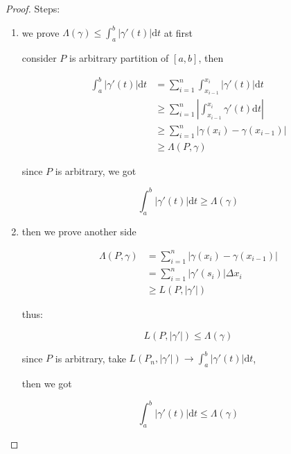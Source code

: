 \begin{proof}
    Steps:


    \begin{enumerate}
        \item we prove $\Lambda(\gamma) \le \int_a^b \left| \gamma'(t) \right| \mathrm{d} t$ at first

        consider $P$ is arbitrary partition of $[a,b]$, then

        \begin{align*}
            \int_a^b \left| \gamma'(t) \right| \mathrm{d}t  &= \sum_{i=1}^{n}\int_{x_{i-1}}^{x_i} \left| \gamma'(t) \right| \mathrm{d}t \\
            & \ge \sum_{i=1}^{n} \left| \int_{x_{i-1}}^{x_i}  \gamma'(t) \mathrm{d}t  \right| \\
            & \ge\sum_{i=1}^{n} \left| \gamma(x_i) - \gamma(x_{i-1})  \right| \\
            & \ge \Lambda(P, \gamma)
        \end{align*}

        since $P$ is arbitrary, we got

        \[
            \int_a^b \left| \gamma'(t) \right| \mathrm{d}t \ge \Lambda(\gamma)
        \]

        \item then we prove another side
        
        \begin{align*}
            \Lambda(P, \gamma) &= \sum_{i=1}^{n} \left| \gamma(x_i) - \gamma(x_{i-1})\right| \\
            &= \sum_{i=1}^{n} \left| \gamma'(s_i) \right| \Delta x_i \\
            & \ge L(P, \left| \gamma'\right|)
        \end{align*}

        thus:

        \[
        L(P, \left| \gamma'\right|) \le \Lambda(\gamma)
        \]

        since $P$ is arbitrary, take $L(P_n, \left| \gamma'\right|) \to \int_a^b \left| \gamma'(t) \right| \mathrm{d} t$, 

        then we got

        \[
            \int_a^b \left| \gamma'(t) \right| \mathrm{d} t \le \Lambda(\gamma)
        \]

    \end{enumerate} 
\end{proof}

